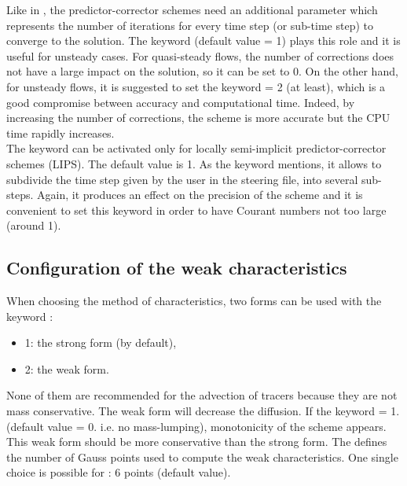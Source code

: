 Like in , the predictor-corrector schemes need an additional
parameter which represents the number of iterations for every time step
(or sub-time step) to converge to the solution.
The keyword 
(default value = 1) plays this role and it is useful for unsteady cases.
For quasi-steady flows, the number of corrections does not have a large impact
on the solution, so it can be set to 0.
On the other hand, for unsteady flows, it is suggested to set the keyword
 = 2 (at least),
which is a good compromise between accuracy and computational time.
Indeed, by increasing the number of corrections, the scheme is more accurate but
the CPU time rapidly increases.\\
The keyword  can be
activated only for locally semi-implicit predictor-corrector schemes (LIPS).
The default value is 1.
As the keyword mentions, it allows to subdivide the time step given by the user
in the steering file, into several sub-steps.
Again, it produces an effect on the precision of the scheme and it is convenient
to set this keyword in order to have Courant numbers not too large (around 1).

\subsection{Configuration of the weak characteristics}

When choosing the method of characteristics, two forms can be used with the
keyword :

\begin{itemize}
\item 1: the strong form (by default),

\item 2: the weak form.
\end{itemize}

None of them are recommended for the advection of tracers because they are not
mass conservative. The weak form will decrease the diffusion. If the keyword
 = 1. (default value = 0. i.e. no
mass-lumping), monotonicity of the scheme appears. This weak form should be
more conservative than the strong form. The  defines the number of Gauss points used to compute the
weak characteristics. One single choice is possible for : 6 points
(default value).


